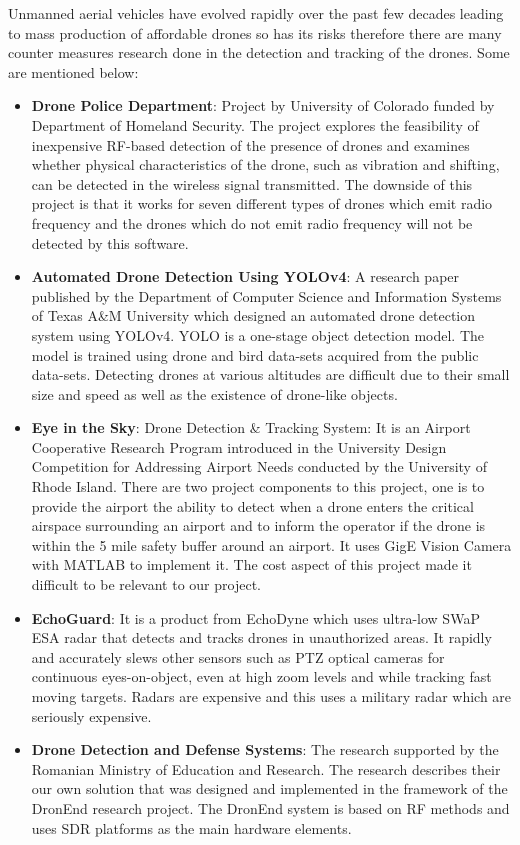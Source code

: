 Unmanned aerial vehicles have evolved rapidly over the past few decades leading to mass production of affordable drones so has its risks therefore there are many counter measures research done in the detection and tracking of the drones. Some are mentioned below: 
\begin{itemize}
  \item  \textbf{Drone Police Department}\cite{Nguyen2017}: Project by University of Colorado funded by Department of Homeland Security. The project explores the feasibility of inexpensive RF-based detection of the presence of drones and examines whether physical characteristics of the drone, such as vibration and shifting, can be detected in the wireless signal transmitted. The downside of this project is that it works for seven different types of drones which emit radio frequency and the drones which do not emit radio frequency will not be detected by this software.
  
  \item \textbf{Automated Drone Detection Using YOLOv4}\cite{Singha2021}: A research paper published by the Department of Computer Science and Information Systems of Texas A&M University which designed an automated drone detection system using YOLOv4. YOLO is a one-stage object detection model. The model is trained using drone and bird data-sets acquired from the public data-sets. Detecting drones at various altitudes are difficult due to their small size and speed as well as the existence of drone-like objects.
  \item \textbf{Eye in the Sky}\cite{Pratt2015}:  Drone Detection & Tracking System:  It is an Airport Cooperative Research Program introduced in the University Design Competition for Addressing Airport Needs conducted by the University of Rhode Island. There are two project components to this project, one is to provide the airport the ability to detect when a drone enters the critical airspace surrounding an airport and to inform the operator if the drone is within the 5 mile safety buffer around an airport.  It uses GigE Vision Camera with MATLAB to implement it. The cost aspect of this project made it difficult to be relevant to our project.
  \item \textbf{EchoGuard}\cite{echoguard}:  It is a product from EchoDyne which uses ultra-low SWaP ESA radar that detects and tracks drones in unauthorized areas. It rapidly and accurately slews other sensors such as PTZ optical cameras for continuous eyes-on-object, even at high zoom levels and while tracking fast moving targets. Radars are expensive and this uses a military radar which are seriously expensive.
  \item \textbf{Drone Detection and Defense Systems}\cite{DroneDetectionChiper}: The research supported by the Romanian Ministry of Education and Research. The research describes their our own solution that was designed and implemented in the framework of the DronEnd research project. The DronEnd system is based on RF methods and uses SDR platforms as the main hardware elements. 
\end{itemize}
